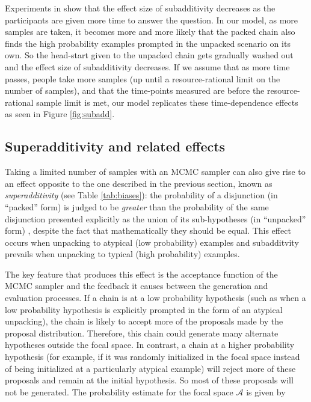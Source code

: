 Experiments in \cite{Dougherty2003} show that the effect size of subadditivity decreases as the participants are given more time to answer the question. In our model, as more samples are taken, it becomes more and more likely that the packed chain also finds the high probability examples prompted in the unpacked scenario on its own. So the head-start given to the unpacked chain gets gradually washed out and the effect size of subadditivity decreases. If we assume that as more time passes, people take more samples (up until a resource-rational limit on the number of samples), and that the time-points measured are before the resource-rational sample limit is met, our model replicates these time-dependence effects as seen in Figure \ref{fig:subadd}.

\subsection{Superadditivity and related effects}

Taking a limited number of samples with an MCMC sampler can also give rise to an effect opposite to the one described in the previous section, known as \emph{superadditivity} (see Table \ref{tab:biases}): the probability of a disjunction (in ``packed'' form) is judged to be \textit{greater} than the probability of the same disjunction presented explicitly as the union of its sub-hypotheses (in ``unpacked'' form) \citep{super,hadjichristidis1999opening}, despite the fact that mathematically they should be equal. This effect occurs when unpacking to atypical (low probability) examples and subadditvity prevails when unpacking to typical (high probability) examples.

The key feature that produces this effect is the acceptance function of the MCMC sampler and the feedback it causes between the generation and evaluation processes. If a chain is at a low probability hypothesis (such as when a low probability hypothesis is explicitly prompted in the form of an atypical unpacking), the chain is likely to accept more of the proposals made by the proposal distribution. Therefore, this chain could generate many alternate hypotheses outside the focal space. In contrast, a chain at a higher probability hypothesis (for example, if it was randomly initialized in the focal space instead of being initialized at a particularly atypical example) will reject more of these proposals and remain at the initial hypothesis. So most of these proposals will not be generated. The probability estimate for the focal space $\mathcal{A}$ is given by 

